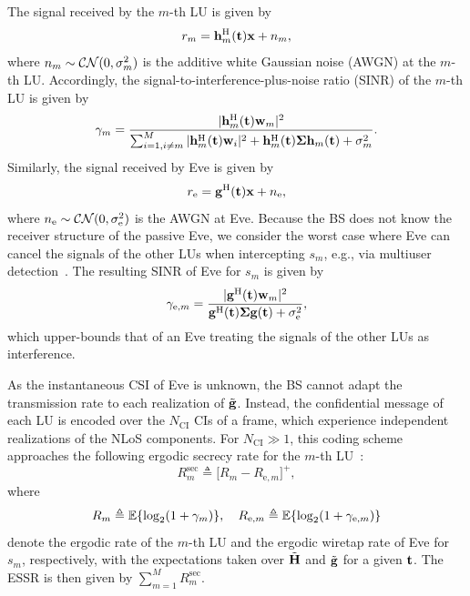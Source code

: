 \documentclass[journal]{IEEEtran}
\newcommand{\rev}[1]{{\color{red}#1}}
\newcommand{\rev}[1]{#1}
\begin{document}
The signal received by the $m$-th LU is given by
\begin{equation}\label{eq:ym}
r_m=\mathbf{h}_m^{\mathrm H}(\mathbf{t})\mathbf{x}+n_m,
\end{equation}
where $n_m\sim\mathcal{CN}(0,\sigma_m^2)$ is the additive white Gaussian noise (AWGN) at the $m$-th LU. Accordingly, the signal-to-interference-plus-noise ratio (SINR) of the $m$-th LU is given by
\begin{equation}\label{eq:sinr_gen}
\gamma_m=\frac{|\mathbf{h}_m^{\mathrm H}(\mathbf{t})\mathbf{w}_m|^2}{\sum_{i=1,i\neq m}^{M}|\mathbf{h}_m^{\mathrm H}(\mathbf{t})\mathbf{w}_i|^2+\mathbf{h}_m^{\mathrm H}(\mathbf{t})\boldsymbol{\Sigma}\mathbf{h}_m(\mathbf{t})+\sigma_m^2}.
\end{equation}
Similarly, the signal received by Eve is given by
\begin{equation}\label{eq:ye}
r_{\mathrm e}=\mathbf{g}^{\mathrm H}(\mathbf{t})\mathbf{x}+n_{\mathrm e},
\end{equation}
where $n_{\mathrm e}\sim\mathcal{CN}(0,\sigma_{\mathrm e}^2)$ is the AWGN at Eve. Because the BS does not know the receiver structure of the passive Eve, we consider the worst case where Eve can cancel the signals of the other LUs when intercepting $s_m$, e.g., via multiuser detection~\cite{ZhuTWC2014}. The resulting SINR of Eve for $s_m$ is given by
\begin{equation}\label{eq:sinre_gen}
\gamma_{\mathrm{e},m}=\frac{|\mathbf{g}^{\mathrm H}(\mathbf{t})\mathbf{w}_m|^2}{\mathbf{g}^{\mathrm H}(\mathbf{t})\boldsymbol{\Sigma}\mathbf{g}(\mathbf{t})+\sigma_{\mathrm e}^2},
\end{equation}
which upper-bounds that of an Eve treating the signals of the other LUs as interference.

As the instantaneous CSI of Eve is unknown, the BS cannot adapt the transmission rate to each realization of $\tilde{\mathbf{g}}$. Instead, the confidential message of each LU is encoded over the $N_{\mathrm{CI}}$ CIs of a frame, which experience independent realizations of the NLoS components. For $N_{\mathrm{CI}}\gg1$, this coding scheme \rev{approaches} the following ergodic secrecy rate for the $m$-th LU~\cite{Gopala2008,ZhuTWC2014}:
\begin{equation}\label{eq:esr}
R_m^{\mathrm{sec}}\triangleq\big[R_m-R_{\mathrm{e},m}\big]^+,
\end{equation}
where
\begin{equation}\label{eq:ergodic}
R_m\triangleq\mathbb{E}\{\log_2(1+\gamma_m)\},\quad R_{\mathrm{e},m}\triangleq\mathbb{E}\{\log_2(1+\gamma_{\mathrm{e},m})\}
\end{equation}
denote the ergodic rate of the $m$-th LU and the ergodic wiretap rate of Eve for $s_m$, respectively, with the expectations taken over $\tilde{\mathbf{H}}$ and $\tilde{\mathbf{g}}$ for a given $\mathbf{t}$. The ESSR is then given by $\sum_{m=1}^MR_m^{\mathrm{sec}}$.
\end{document}
